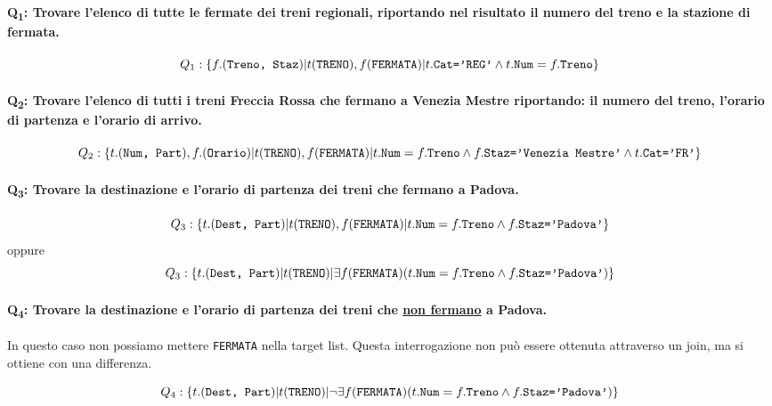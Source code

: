 \documentclass{report}
\begin{document}
\paragraph{Q\textsubscript{1}: Trovare l'elenco di tutte le fermate dei treni regionali, riportando nel risultato il numero del treno e la stazione di fermata.}

\[ Q_1: \{f.(\text{\texttt{Treno, Staz}}) | t(\text{\texttt{TRENO}}), f(\text{\texttt{FERMATA}}) | t.\text{\texttt{Cat='REG'}} \wedge t.\text{\texttt{Num}} = f.\text{\texttt{Treno}} \} \]

\paragraph{Q\textsubscript{2}: Trovare l'elenco di tutti i treni Freccia Rossa che fermano a Venezia Mestre riportando: il numero del treno, l'orario di partenza e l'orario di arrivo.}

\[ Q_2: \{t.(\text{\texttt{Num, Part}}), f.(\text{\texttt{Orario}}) | t(\text{\texttt{TRENO}}), f(\text{\texttt{FERMATA}}) |t.\text{\texttt{Num}} = f.\text{\texttt{Treno}}\wedge f.\text{\texttt{Staz='Venezia Mestre'}} \wedge t.\text{\texttt{Cat='FR'}} \} \]

\paragraph{Q\textsubscript{3}: Trovare la destinazione e l'orario di partenza dei treni che fermano a Padova.}

\[ Q_3: \{t.(\text{\texttt{Dest, Part}})| t(\text{\texttt{TRENO}}), f(\text{\texttt{FERMATA}}) |t.\text{\texttt{Num}} = f.\text{\texttt{Treno}}\wedge f.\text{\texttt{Staz='Padova'}}\} \]
oppure 
\[ Q_3: \{t.(\text{\texttt{Dest, Part}})| t(\text{\texttt{TRENO}}) | \exists f(\text{\texttt{FERMATA}}) (t.\text{\texttt{Num}} = f.\text{\texttt{Treno}}\wedge f.\text{\texttt{Staz='Padova'}})\} \]

\paragraph{Q\textsubscript{4}: Trovare la destinazione e l'orario di partenza dei treni che \underline{non fermano} a Padova.}

In questo caso non possiamo mettere \texttt{FERMATA} nella target list. Questa interrogazione non pu\`o essere ottenuta attraverso un join, ma si ottiene con una differenza.

\[ Q_4: \{t.(\text{\texttt{Dest, Part}})| t(\text{\texttt{TRENO}}) | \neg\exists f(\text{\texttt{FERMATA}}) (t.\text{\texttt{Num}} = f.\text{\texttt{Treno}}\wedge f.\text{\texttt{Staz='Padova'}})\} \]
\end{document}
